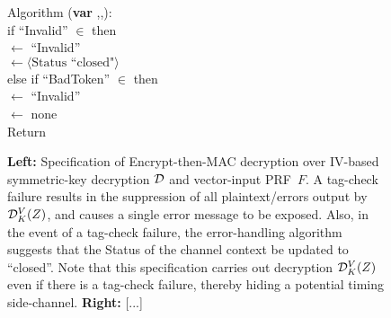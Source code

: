 \begin{figure}
{\medskip
Algorithm ({\bf var} ,,):\\
\nudge if ``Invalid'' $\in$  then \\
\nudge\nudge {} $\gets$ ``Invalid'' \\
\nudge\nudge {} $\gets \langle
\mbox{Status ``closed"} \rangle$\\
\nudge else if ``BadToken'' $\in$  then \\
\nudge\nudge {} $\gets$ ``Invalid'' \\
\nudge\nudge {} $\gets$ none \\
\nudge Return 
} 
\caption{ {\bf
    Left:} Specification of Encrypt-then-MAC decryption over IV-based
  symmetric-key decryption $\mathcal{D}$ and vector-input PRF~$F$. A tag-check failure results in the
suppression of all plaintext/errors output by $\mathcal{D}^V_K(Z)$, and
causes a single error message to be exposed.  Also,
in the event of a tag-check failure, the error-handling algorithm
suggests that the Status of the channel context be updated to
``closed''.  Note that this specification carries out decryption
$\mathcal{D}^V_K(Z)$ even if there is a tag-check failure, thereby hiding a
potential timing side-channel. 
%
{\bf
  Right: } [...]
}
\label{fig:EtM-aead}
\end{figure}
